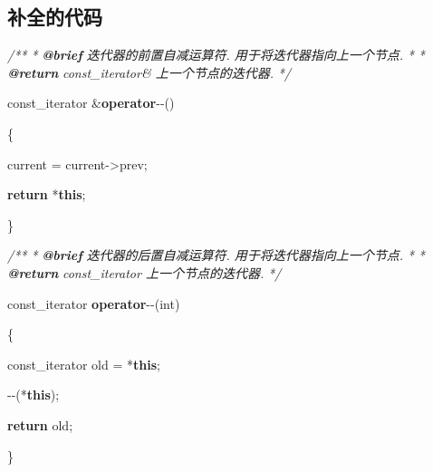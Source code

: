\documentclass[
]{article}
\author{}
\date{}
\newenvironment{Shaded}{}{}
\newcommand{\AnnotationTok}[1]{\textcolor[rgb]{0.38,0.63,0.69}{\textbf{\textit{#1}}}}
\newcommand{\CommentTok}[1]{\textcolor[rgb]{0.38,0.63,0.69}{\textit{#1}}}
\newcommand{\ControlFlowTok}[1]{\textcolor[rgb]{0.00,0.44,0.13}{\textbf{#1}}}
\newcommand{\DataTypeTok}[1]{\textcolor[rgb]{0.56,0.13,0.00}{#1}}
\newcommand{\KeywordTok}[1]{\textcolor[rgb]{0.00,0.44,0.13}{\textbf{#1}}}
\newcommand{\NormalTok}[1]{#1}
\newcommand{\OperatorTok}[1]{\textcolor[rgb]{0.40,0.40,0.40}{#1}}
\begin{document}
\hypertarget{ux8865ux5168ux7684ux4ee3ux7801}{%
\subsection{补全的代码}\label{ux8865ux5168ux7684ux4ee3ux7801}}

\begin{Shaded}
\begin{Highlighting}[]
\CommentTok{/**
}
\CommentTok{ * }\AnnotationTok{@brief}\CommentTok{ 迭代器的前置自减运算符. 用于将迭代器指向上一个节点.
}
\CommentTok{ *
}
\CommentTok{ * }\AnnotationTok{@return}\CommentTok{ const\_iterator\& 上一个节点的迭代器.
}
\CommentTok{ */}

\NormalTok{const\_iterator }\OperatorTok{\&}\KeywordTok{operator}\OperatorTok{{-}{-}()}

\OperatorTok{\{}

\NormalTok{    current }\OperatorTok{=}\NormalTok{ current}\OperatorTok{{-}\textgreater{}}\NormalTok{prev}\OperatorTok{;}

    \ControlFlowTok{return} \OperatorTok{*}\KeywordTok{this}\OperatorTok{;}

\OperatorTok{\}}



\CommentTok{/**
}
\CommentTok{ * }\AnnotationTok{@brief}\CommentTok{ 迭代器的后置自减运算符. 用于将迭代器指向上一个节点.
}
\CommentTok{ *
}
\CommentTok{ * }\AnnotationTok{@return}\CommentTok{ const\_iterator 上一个节点的迭代器.
}
\CommentTok{ */}

\NormalTok{const\_iterator }\KeywordTok{operator}\OperatorTok{{-}{-}(}\DataTypeTok{int}\OperatorTok{)}

\OperatorTok{\{}

\NormalTok{    const\_iterator old }\OperatorTok{=} \OperatorTok{*}\KeywordTok{this}\OperatorTok{;}

    \OperatorTok{{-}{-}(*}\KeywordTok{this}\OperatorTok{);}

    \ControlFlowTok{return}\NormalTok{ old}\OperatorTok{;}

\OperatorTok{\}}
\end{Highlighting}
\end{Shaded}
\end{document}
